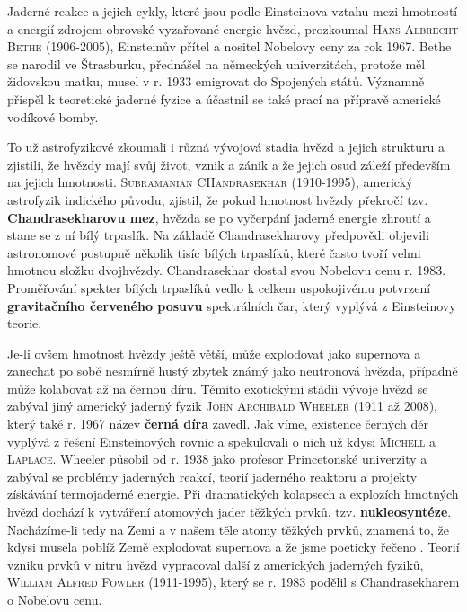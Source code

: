         Jaderné reakce a jejich cykly, které jsou podle Einsteinova vztahu mezi hmotností a energií
        zdrojem obrovské vyzařované energie hvězd, prozkoumal \textsc{Hans Albrecht Bethe}
        (1906-2005), Einsteinův přítel a nositel Nobelovy ceny za rok 1967. Bethe se narodil ve
        Štrasburku, přednášel na německých univerzitách, protože měl židovskou matku, musel v r.
        1933 emigrovat do Spojených států. Významně přispěl k teoretické jaderné fyzice a účastnil
        se také prací na přípravě americké vodíkové bomby.

        To už astrofyzikové zkoumali i různá vývojová stadia hvězd a jejich strukturu a zjistili, že
        hvězdy mají svůj život, vznik a zánik a že jejich osud záleží především na jejich hmotnosti.
        \textsc{Subramanian CHandrasekhar} (1910-1995), americký astrofyzik indického původu,
        zjistil, že pokud hmotnost hvězdy překročí tzv. \textbf{Chandrasekharovu mez}, hvězda se po
        vyčerpání jaderné energie zhroutí a stane se z ní bílý trpaslík. Na základě Chandrasekharovy
        předpovědi objevili astronomové postupně několik tisíc bílých trpaslíků, které často tvoří
        velmi hmotnou složku dvojhvězdy. Chandrasekhar dostal svou Nobelovu cenu r. 1983.
        Proměřování spekter bílých trpaslíků vedlo k celkem uspokojivému potvrzení
        \textbf{gravitačního červeného posuvu} spektrálních čar, který vyplývá z Einsteinovy teorie.

        Je-li ovšem hmotnost hvězdy ještě větší, může explodovat jako supernova a zanechat po sobě
        nesmírně hustý zbytek známý jako neutronová hvězda, případně může kolabovat až na černou
        díru. Těmito exotickými stádii vývoje hvězd se zabýval jiný americký jaderný fyzik
        \textsc{John Archibald Wheeler} (1911 až 2008), který také r. 1967 název \textbf{černá díra}
        zavedl. Jak víme, existence černých děr vyplývá z řešení Einsteinových rovnic a spekulovali
        o nich už kdysi \textsc{Michell} a \textsc{Laplace}. Wheeler působil od r. 1938 jako
        profesor Princetonské univerzity a zabýval se problémy jaderných reakcí, teorií jaderného
        reaktoru a projekty získávání termojaderné energie. Při dramatických kolapsech a explozích
        hmotných hvězd dochází k vytváření atomových jader těžkých prvků, tzv.
        \textbf{nukleosyntéze}. Nacházíme-li tedy na Zemi a v našem těle atomy těžkých prvků,
        znamená to, že kdysi musela poblíž Země explodovat supernova a že jsme poeticky řečeno
        . Teorií vzniku prvků v nitru hvězd vypracoval další z amerických
        jaderných fyziků, \textsc{William Alfred Fowler} (1911-1995), který se r. 1983 podělil s
        Chandrasekharem o Nobelovu cenu.
        



